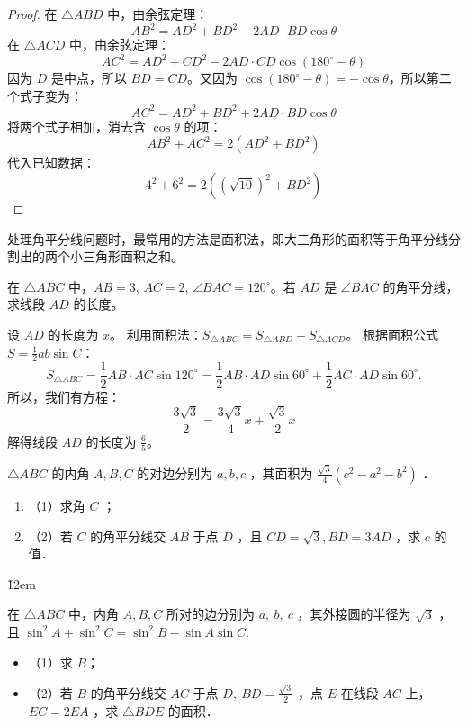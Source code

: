 \begin{proof}
    在 $\triangle ABD$ 中，由余弦定理：
    $$
        AB^2 = AD^2 + BD^2 - 2 AD \cdot BD \cos\theta
    $$
    在 $\triangle ACD$ 中，由余弦定理：
    $$
        AC^2 = AD^2 + CD^2 - 2 AD \cdot CD \cos(180^\circ - \theta)
    $$
    因为 $D$ 是中点，所以 $BD=CD$。又因为 $\cos(180^\circ - \theta) = -\cos\theta$，所以第二个式子变为：
    $$
        AC^2 = AD^2 + BD^2 + 2 AD \cdot BD \cos\theta
    $$
    将两个式子相加，消去含 $\cos\theta$ 的项：
    $$
        AB^2 + AC^2 = 2(AD^2 + BD^2)
    $$
    代入已知数据：
    $$
        4^2 + 6^2 = 2((\sqrt{10})^2 + BD^2)
    $$
\end{proof}
\vspace{2em}

\begin{theorem}[角平分线模型]
    处理角平分线问题时，最常用的方法是面积法，即大三角形的面积等于角平分线分割出的两个小三角形面积之和。
\end{theorem}

\begin{example}
    在 $\triangle ABC$ 中，$AB=3$, $AC=2$, $\angle BAC = 120^\circ$。若 $AD$ 是 $\angle BAC$ 的角平分线，求线段 $AD$ 的长度。
\end{example}
\begin{solution}
    设 $AD$ 的长度为 $x$。
    利用面积法：$S_{\triangle ABC} = S_{\triangle ABD} + S_{\triangle ACD}$。
    根据面积公式 $S = \frac{1}{2}ab \sin C$：
    $$
        S_{\triangle ABC} = \frac{1}{2} AB \cdot AC \sin 120^\circ = \frac{1}{2} AB \cdot AD \sin 60^\circ + \frac{1}{2} AC \cdot AD \sin 60^\circ.
    $$
    所以，我们有方程：
    $$
        \frac{3\sqrt{3}}{2} = \frac{3\sqrt{3}}{4}x + \frac{\sqrt{3}}{2}x
    $$
    解得线段 $AD$ 的长度为 $\frac{6}{5}$。
\end{solution}
\vspace{2em}

\begin{problem}
$\triangle A B C$ 的内角 $A, B, C$ 的对边分别为 $a, b, c$ ，其面积为 $\frac{\sqrt{3}}{4}\left(c^2-a^2-b^2\right)$ ．
\begin{enumerate}
    \item （1）求角 $C$ ；
    \item （2）若 $C$ 的角平分线交 $A B$ 于点 $D$ ，且 $C D=\sqrt{3}, B D=3 A D$ ，求 $c$ 的值．
\end{enumerate}
\end{problem}
\v{12em}

\begin{problem}
在 $\triangle A B C$ 中，内角 $A, B, C$ 所对的边分别为 $a, ~ b, ~ c$ ，其外接圆的半径为 $\sqrt{3}$ ，且 $\sin ^2 A+\sin ^2 C=\sin ^2 B-\sin A \sin C$.
\begin{itemize}
    \item （1）求 $B$；
    \item （2）若 $B$ 的角平分线交 $A C$ 于点 $D, ~ B D=\frac{\sqrt{3}}{2}$ ，点 $E$ 在线段 $A C$ 上，$E C=2 E A$ ，求 $\triangle B D E$ 的面积．
\end{itemize}
\end{problem}

